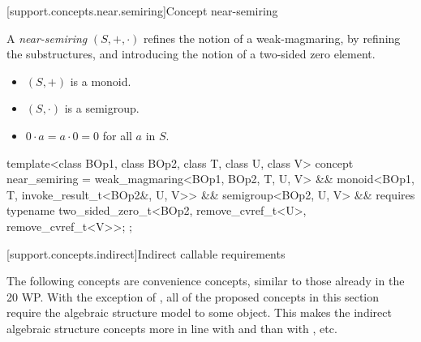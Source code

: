 [support.concepts.near.semiring]{Concept near-semiring}

\pnum
A \textit{near-semiring} $(S, +, \cdot)$ refines the notion of a weak-magmaring, by refining the
substructures, and introducing the notion of a two-sided zero element.
\begin{itemize}
   \item $(S, +)$ is a monoid.
   \item $(S, \cdot)$ is a semigroup.
   \item $0 \cdot a = a \cdot 0 = 0$ for all $a$ in $S$.
\end{itemize}

\begin{itemdecl}
  template<class BOp1, class BOp2, class T, class U, class V>
  concept near_semiring = weak_magmaring<BOp1, BOp2, T, U, V> &&
    monoid<BOp1, T, invoke_result_t<BOp2&, U, V>> && semigroup<BOp2, U, V> && requires {
      typename two_sided_zero_t<BOp2, remove_cvref_t<U>, remove_cvref_t<V>>;
    };
\end{itemdecl}

[support.concepts.indirect]{Indirect callable requirements}

The following concepts are convenience concepts, similar to those already in the \Cpp{}20 WP. With
the exception of , all of the proposed concepts in this
section require the algebraic structure model  to some object. This makes the
indirect algebraic structure concepts more in line with  and  than
with , etc.

